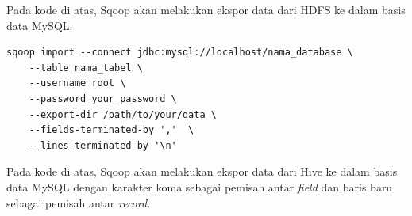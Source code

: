 Pada kode di atas, Sqoop akan melakukan ekspor data dari HDFS ke dalam basis data MySQL.

\begin{lstlisting}[caption=Perintah Ekspor Sqoop dari Hive ke Basis Data MySQL]
	sqoop import --connect jdbc:mysql://localhost/nama_database \
	--table nama_tabel \ 
	--username root \
	--password your_password \
	--export-dir /path/to/your/data \
	--fields-terminated-by ','  \
	--lines-terminated-by '\n'
\end{lstlisting}

Pada kode di atas, Sqoop akan melakukan ekspor data dari Hive ke dalam basis data MySQL dengan karakter koma sebagai pemisah antar \textit{field} dan baris baru sebagai pemisah antar \textit{record}.
